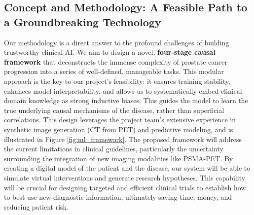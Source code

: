 \documentclass[11pt, a4paper]{article}
\begin{document}
\subsection{Concept and Methodology: A Feasible Path to a Groundbreaking Technology}
Our methodology is a direct answer to the profound challenges of building trustworthy clinical AI. We aim to design a novel, \textbf{four-stage causal framework} that deconstructs the immense complexity of prostate cancer progression into a series of well-defined, manageable tasks. This modular approach is the key to our project's feasibility: it ensures training stability, enhances model interpretability, and allows us to systematically embed clinical domain knowledge as strong inductive biases. This guides the model to learn the true underlying causal mechanisms of the disease, rather than superficial correlations. This design leverages the project team's extensive experience in synthetic image generation (CT from PET) and predictive modeling, and is illustrated in Figure \ref{fig:ml_framework}. The proposed framework will address the current limitations in clinical guidelines, particularly the uncertainty surrounding the integration of new imaging modalities like PSMA-PET. By creating a digital model of the patient and the disease, our system will be able to simulate virtual interventions and generate research hypotheses. This capability will be crucial for designing targeted and efficient clinical trials to establish how to best use new diagnostic information, ultimately saving time, money, and reducing patient risk.
\end{document}
